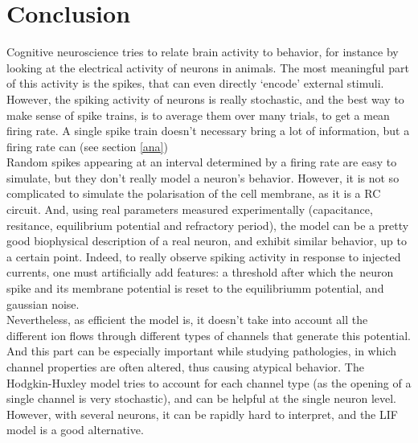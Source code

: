 \documentclass{article}
\begin{document}
\section{Conclusion}
Cognitive neuroscience tries to relate brain activity to behavior, for instance by looking at the electrical activity of neurons in animals. The most meaningful part of this activity is the spikes, that can even directly `encode' external stimuli. However, the spiking activity of neurons is really stochastic, and the best way to make sense of spike trains, is to average them over many trials, to get a mean firing rate. A single spike train doesn't necessary bring a lot of information, but a firing rate can (see section \ref{ana})\\

Random spikes appearing at an interval determined by a firing rate are easy to simulate, but they don't really model a neuron's behavior. However, it is not so complicated to simulate the polarisation of the cell membrane, as it is a RC circuit. And, using real parameters measured experimentally (capacitance, resitance, equilibrium potential and refractory period), the model can be a pretty good biophysical description of a real neuron, and exhibit similar behavior, up to a certain point. Indeed, to really observe spiking activity in response to injected currents, one must artificially add features: a threshold after which the neuron spike and its membrane potential is reset to the equilibriumm potential, and gaussian noise.\\

Nevertheless, as efficient the model is, it doesn't take into account all the different ion flows through different types of channels that generate this potential. And this part can be especially important while studying pathologies, in which channel properties are often altered, thus causing atypical behavior. The Hodgkin-Huxley model tries to account for each channel type (as the opening of a single channel is very stochastic), and can be helpful at the single neuron level. However, with several neurons, it can be rapidly hard to interpret, and the LIF model is a good alternative.
\end{document}
